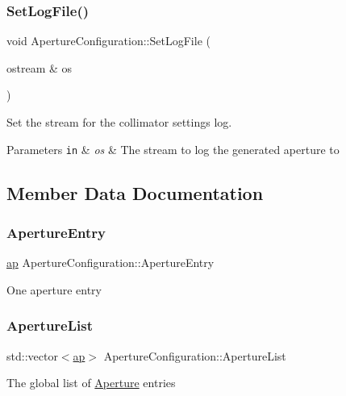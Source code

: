 \subsubsection{\texorpdfstring{Set\+Log\+File()}{SetLogFile()}}
{\footnotesize\ttfamily void Aperture\+Configuration\+::\+Set\+Log\+File (\begin{DoxyParamCaption}\item[{ostream \&}]{os }\end{DoxyParamCaption})}

Set the stream for the collimator settings log. 
\begin{DoxyParams}[1]{Parameters}
\mbox{\tt in}  & {\em os} & The stream to log the generated aperture to \\
\hline
\end{DoxyParams}


\subsection{Member Data Documentation}
\mbox{\label{classApertureConfiguration_a20692047dd6ec339da5bf9e80f9f9f3c}} 
\subsubsection{\texorpdfstring{Aperture\+Entry}{ApertureEntry}}
{\footnotesize\ttfamily \hyperlink{structApertureConfiguration_1_1ap}{ap} Aperture\+Configuration\+::\+Aperture\+Entry}

One aperture entry \mbox{\label{classApertureConfiguration_a4b70556fb8ac55e8fb5d3d3e0b75b039}} 
\subsubsection{\texorpdfstring{Aperture\+List}{ApertureList}}
{\footnotesize\ttfamily std\+::vector$<$\hyperlink{structApertureConfiguration_1_1ap}{ap}$>$ Aperture\+Configuration\+::\+Aperture\+List}

The global list of \hyperlink{classAperture}{Aperture} entries \mbox{\label{classApertureConfiguration_a3b08ff20e5bbbb3d28d73048e1933f9f}} 
